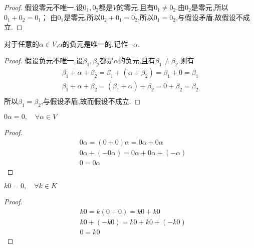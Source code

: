 \documentclass[blue,normal,cn]{elegantnote}
\begin{document}
\begin{theorem}
\begin{proof}
    假设零元不唯一,设$0_1,0_2$都是$V$的零元,且有$0_1 ≠ 0_2 $.由$0_2$是零元,所以$0_1+0_2=0_1$；
    由$0_1$是零元,所以$0_2+0_1=0_2$,所以$0_1=0_2$,与假设矛盾,故假设不成立.
\end{proof}

\begin{property}
    对于任意的$α ∈ V$,$α$的负元是唯一的,记作$-α$.
\end{property}

\begin{proof}
    假设负元不唯一,设$β_1,β_2$都是$α$的负元,且有$β_1 ≠ β_2 $.则有
    \begin{equation*}
        \begin{aligned}
            β_1+α+β_2=β_1+(α+β_2)=β_1+0=β_1\\
            β_1+α+β_2= (β_1+α)+β_2=0+β_2=β_2\\
        \end{aligned}
    \end{equation*}
    所以$β_1=β_2$,与假设矛盾,故而假设不成立.
\end{proof}


\begin{property}
    $0α=0,\quad \forall α ∈ V$
\end{property}

\begin{proof}
    \begin{equation*}
        \begin{aligned}
        &0α=(0+0)α=0α+0α\\
        &0α+(-0α)=0α+0α+(-α)\\
        &0=0α
        \end{aligned}
    \end{equation*}
\end{proof}


\begin{property}
    $k0=0,\quad \forall k ∈ K$
\end{property}

\begin{proof}
    \begin{equation*}
        \begin{aligned}
        &k0=k(0+0)=k0+k0\\
        &k0+(-k0)=k0+k0+(-k0)\\
        &0=k0
        \end{aligned}
    \end{equation*}
\end{proof}


\end{theorem}
\end{document}
